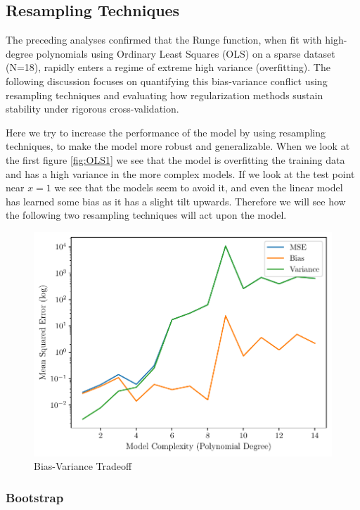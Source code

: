 \documentclass[twocolumn,aps]{revtex4}
\begin{document}
\subsection{Resampling Techniques}
The preceding analyses confirmed that the Runge function, when fit with high-degree polynomials using Ordinary Least Squares (OLS) on a sparse dataset (N=18), rapidly enters a regime of extreme high variance (overfitting). 
The following discussion focuses on quantifying this bias-variance conflict using resampling techniques and evaluating how regularization methods sustain stability under rigorous cross-validation.

Here we try to increase the performance of the model by using resampling techniques, to make the model more robust and generalizable.
When we look at the first figure \ref{fig:OLS1} we see that the model is overfitting the training data and has a high variance in the more complex models.
If we look at the test point near $x=1$ we see that the models seem to avoid it, and even the linear model has learned some bias as it has a slight tilt upwards.
Therefore we will see how the following two resampling techniques will act upon the model.

\begin{figure}[h]
    \centering
    \includegraphics[width=.95 \linewidth]{Figures/bias_variance_tradeoff.pdf}
    \caption{Bias-Variance Tradeoff}
    \label{fig:biasvariance}
\end{figure}

\subsubsection{Bootstrap}
\end{document}
